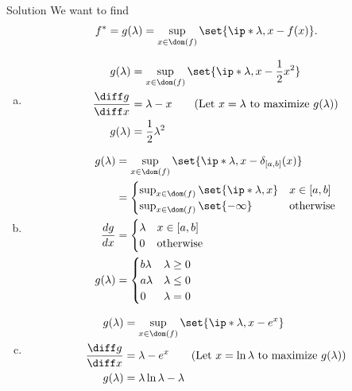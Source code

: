\documentclass{article}
\theoremstyle{plain}
\theoremstyle{definition}
\theoremstyle{remark}
\begin{document}
\begin{solution}
    {Solution}
    We want to find \[f^* = g(\lambda) = \sup_{x\in\dom(f)}\set{\ip*{\lambda, x}-f(x)}.\]
    \begin{enumerate}[(a)]
        \item {
            \begin{align*}
                g(\lambda) 
                &= \sup_{x\in\dom(f)}\set{\ip*{\lambda, x}-\frac{1}{2}x^2} \\
                \frac{\diff g}{\diff x} &= \lambda - x \tag{\text{Let $x=\lambda$ to maximize $g(\lambda)$}}\\
                g(\lambda) &= \frac{1}{2}\lambda^2
            \end{align*}
        }
        \item {
            \begin{align*}
                g(\lambda) 
                &= \sup_{x\in\dom(f)}\set{\ip*{\lambda, x}-\delta_{[a, b]}(x)} \\
                &= \begin{cases}
                    \sup_{x\in\dom(f)}\set{\ip*{\lambda, x}} & x\in[a, b] \\
                    \sup_{x\in\dom(f)} \set{-\infty} & \text{otherwise}
                \end{cases} \\
                \frac{dg}{dx} &= \begin{cases}
                    \lambda & x\in[a, b] \\
                    0 & \text{otherwise}
                \end{cases} \\
                g(\lambda) &= \begin{cases}
                    b\lambda & \lambda\geq 0 \\
                    a\lambda & \lambda\leq 0 \\
                    0 & \lambda=0
                \end{cases}
            \end{align*}
        }
        \item {
            \begin{align*}
                g(\lambda)
                &= \sup_{x\in\dom(f)}\set{\ip*{\lambda, x}-e^x} \\
                \frac{\diff g}{\diff x} &= \lambda - e^x \tag{\text{Let $x=\ln\lambda$ to maximize $g(\lambda)$}}\\
                g(\lambda) &= \lambda\ln\lambda - \lambda
            \end{align*}
        }
    \end{enumerate}
\end{solution}
\end{document}
